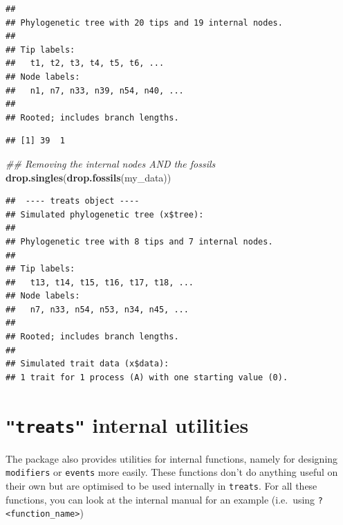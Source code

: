\documentclass[
]{book}
\newenvironment{Shaded}{\begin{snugshade}}{\end{snugshade}}
\newcommand{\CommentTok}[1]{\textcolor[rgb]{0.56,0.35,0.01}{\textit{#1}}}
\newcommand{\KeywordTok}[1]{\textcolor[rgb]{0.13,0.29,0.53}{\textbf{#1}}}
\newcommand{\NormalTok}[1]{#1}
\newcommand{\OperatorTok}[1]{\textcolor[rgb]{0.81,0.36,0.00}{\textbf{#1}}}
\begin{document}
\begin{verbatim}
## 
## Phylogenetic tree with 20 tips and 19 internal nodes.
## 
## Tip labels:
##   t1, t2, t3, t4, t5, t6, ...
## Node labels:
##   n1, n7, n33, n39, n54, n40, ...
## 
## Rooted; includes branch lengths.
\end{verbatim}

\begin{Shaded}
\end{Shaded}

\begin{verbatim}
## [1] 39  1
\end{verbatim}

\begin{Shaded}
\begin{Highlighting}[]
\CommentTok{\#\# Removing the internal nodes AND the fossils}
\KeywordTok{drop.singles}\NormalTok{(}\KeywordTok{drop.fossils}\NormalTok{(my\_data))}
\end{Highlighting}
\end{Shaded}

\begin{verbatim}
##  ---- treats object ---- 
## Simulated phylogenetic tree (x$tree):
## 
## Phylogenetic tree with 8 tips and 7 internal nodes.
## 
## Tip labels:
##   t13, t14, t15, t16, t17, t18, ...
## Node labels:
##   n7, n33, n54, n53, n34, n45, ...
## 
## Rooted; includes branch lengths.
## 
## Simulated trait data (x$data):
## 1 trait for 1 process (A) with one starting value (0).
\end{verbatim}

\hypertarget{treats-internal-utilities}{%
\section{\texorpdfstring{\texttt{"treats"} internal utilities}{"treats" internal utilities}}\label{treats-internal-utilities}}

The package also provides utilities for internal functions, namely for designing \texttt{modifiers} or \texttt{events} more easily.
These functions don't do anything useful on their own but are optimised to be used internally in \texttt{treats}.
For all these functions, you can look at the internal manual for an example (i.e.~using \texttt{?\textless{}function\_name\textgreater{}})
\end{document}
